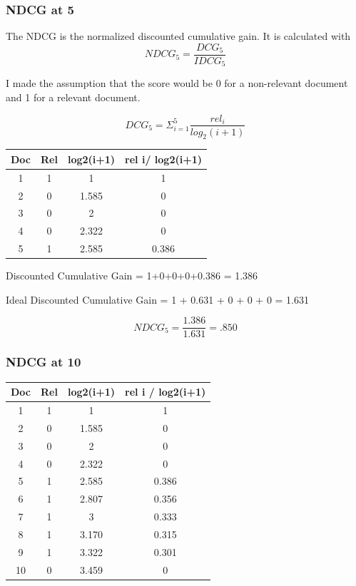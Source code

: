 \documentclass[letterpaper,12pt]{article}
\begin{document}
\subsubsection{NDCG at 5}

The NDCG is the normalized discounted cumulative gain. It is calculated with 
$$NDCG_5=\frac{DCG_5}{IDCG_5}$$

I made the assumption that the score would be 0 for a non-relevant document and 1 for a relevant document.

$$DCG_5 = \Sigma_{i=1}^5\frac{rel_i}{log_2(i+1)}$$


\begin{center}
\begin{tabular}{ |c|c|c|c| } 
 \hline
 Doc & Rel & log2(i+1)	& rel i/ log2(i+1) \\ 
\hline
 1 & 1 & 1 & 1\\ 
 2 & 0 & 1.585 & 0\\ 
 3 & 0 & 2 & 0\\ 
 4 & 0 & 2.322 & 0\\ 
 5 & 1 & 2.585 & 0.386\\ 
 \hline
\end{tabular}
\end{center}

Discounted Cumulative Gain = 1+0+0+0+0.386 = 1.386 


Ideal Discounted Cumulative Gain = 1 +  0.631 + 0 + 0 + 0 = 1.631

$$NDCG_5 = \frac{ 1.386 }{ 1.631} = .850 $$


\subsubsection{NDCG at 10}

\begin{center}
\begin{tabular}{ |c|c|c|c| } 
 \hline
 Doc & Rel & log2(i+1)	& rel i / log2(i+1) \\ 
\hline
 1 & 1 & 1 & 1\\ 
 2 & 0 & 1.585 & 0\\ 
 3 & 0 & 2 & 0\\ 
 4 & 0 & 2.322 & 0\\ 
 5 & 1 & 2.585 & 0.386\\ 
 6& 1 & 2.807 & 0.356\\ 
 7 & 1 & 3 & 0.333\\ 
 8 & 1 & 3.170 & 0.315\\ 
 9 & 1 & 3.322 & 0.301\\ 
 10 & 0 & 3.459 & 0\\ 
 \hline
\end{tabular}
\end{center}
\end{document}
